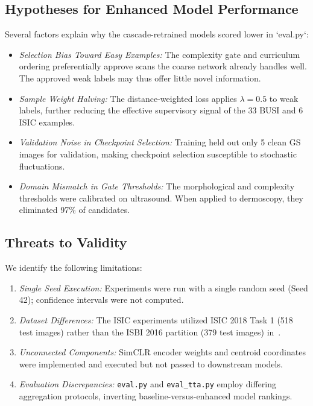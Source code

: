 \documentclass[journal,11pt,onecolumn,draftclsnofoot]{IEEEtran}
\begin{document}
\subsection{Hypotheses for Enhanced Model Performance}
Several factors explain why the cascade-retrained models scored lower in `eval.py`:
\begin{itemize}
    \item \emph{Selection Bias Toward Easy Examples:} The complexity gate and curriculum ordering preferentially approve scans the coarse network already handles well. The approved weak labels may thus offer little novel information.
    \item \emph{Sample Weight Halving:} The distance-weighted loss applies $\lambda = 0.5$ to weak labels, further reducing the effective supervisory signal of the 33 BUSI and 6 ISIC examples.
    \item \emph{Validation Noise in Checkpoint Selection:} Training held out only 5 clean GS images for validation, making checkpoint selection susceptible to stochastic fluctuations.
    \item \emph{Domain Mismatch in Gate Thresholds:} The morphological and complexity thresholds were calibrated on ultrasound. When applied to dermoscopy, they eliminated 97\% of candidates.
\end{itemize}

\subsection{Threats to Validity}
We identify the following limitations:
\begin{enumerate}
    \item \emph{Single Seed Execution:} Experiments were run with a single random seed (Seed 42); confidence intervals were not computed.
    \item \emph{Dataset Differences:} The ISIC experiments utilized ISIC 2018 Task 1 (518 test images) rather than the ISBI 2016 partition (379 test images) in~\cite{deshpande2024}.
    \item \emph{Unconnected Components:} SimCLR encoder weights and centroid coordinates were implemented and executed but not passed to downstream models.
    \item \emph{Evaluation Discrepancies:} \texttt{eval.py} and \texttt{eval\_tta.py} employ differing aggregation protocols, inverting baseline-versus-enhanced model rankings.
\end{enumerate}
\end{document}

